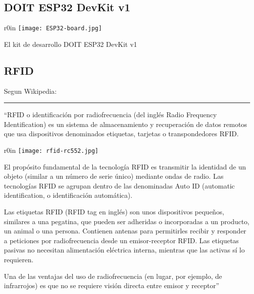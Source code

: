 \documentclass[../informe_krapp.tex]{subfiles}
\begin{document}









\clearpage

\subsection{DOIT ESP32 DevKit v1}
\begin{wrapfigure}{r}{0in}
	\centering
	\texttt{[image: ESP32-board.jpg]}
\end{wrapfigure}
El kit de desarrollo DOIT ESP32 DevKit v1



\clearpage
\subsection{RFID}
Segun Wikipedia\cite{wikipedia_rfid_es}:

\begin{center}
	\rule{0.9\textwidth}{0.5pt}
\end{center}
``RFID o identificación por radiofrecuencia
(del inglés Radio Frequency Identification) es un sistema de almacenamiento y recuperación
de datos remotos que usa dispositivos denominados etiquetas, tarjetas o transpondedores
RFID.

\begin{wrapfigure}{r}{0in}
	\centering
	\texttt{[image: rfid-rc552.jpg]}
\end{wrapfigure}

El propósito fundamental de la tecnología RFID es transmitir la identidad de
un objeto (similar a un número de serie único) mediante ondas de radio. Las tecnologías
RFID se agrupan dentro de las denominadas Auto ID (automatic identification,
o identificación automática).

Las etiquetas RFID (RFID tag en inglés) son unos dispositivos pequeños, similares
a una pegatina, que pueden ser adheridas o incorporadas a un producto, un animal
o una persona. Contienen antenas para permitirles recibir y responder a peticiones
por radiofrecuencia desde un emisor-receptor RFID. Las etiquetas pasivas no necesitan
alimentación eléctrica interna, mientras que las activas sí lo requieren.

Una de las ventajas del uso de radiofrecuencia (en lugar, por ejemplo, de infrarrojos)
es que no se requiere visión directa entre emisor y receptor''
\end{document}
